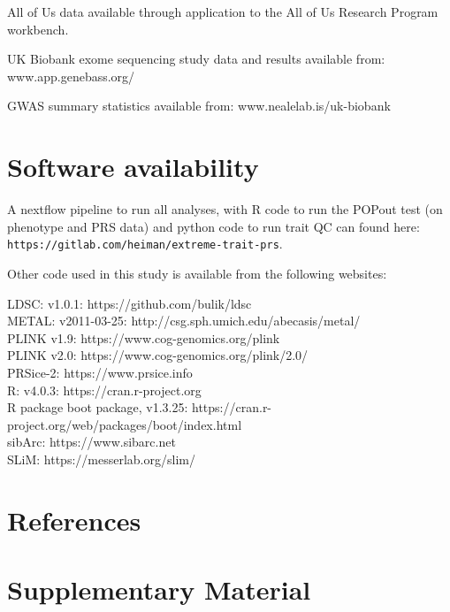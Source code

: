 \documentclass[12pt]{zHenriquesLab-StyleBioRxiv}
\begin{document}
{{{All of Us data available through application to the All of Us Research Program workbench.

UK Biobank exome sequencing study data and results available from: www.app.genebass.org/

GWAS summary statistics available from: www.nealelab.is/uk-biobank


   }

\section*{Software availability}
A nextflow pipeline to run all analyses, with R code to run the POPout test (on phenotype and PRS data) and
python code to run trait QC can found here: {\tt https://gitlab.com/heiman/extreme-trait-prs}.
  
Other code used in this study is available from the following websites:
 
     LDSC: v1.0.1: {https://github.com/bulik/ldsc} \\
    METAL: v2011-03-25: {http://csg.sph.umich.edu/abecasis/metal/} \\
    PLINK v1.9: {https://www.cog-genomics.org/plink}\\
    PLINK v2.0: {https://www.cog-genomics.org/plink/2.0/}     \\
    PRSice-2: {https://www.prsice.info} \\
     R:  v4.0.3: {https://cran.r-project.org}\\
     R package boot package, v1.3.25: {https://cran.r-project.org/web/packages/boot/index.html}\\
     sibArc: {https://www.sibarc.net}\\
     SLiM: {https://messerlab.org/slim/}\\

\section*{References} \label{sec:references} 

\clearpage \newpage


\section*{Supplementary Material} \label{sec:supplement}


\renewcommand{\figurename}{Supplementary Figure}
\setcounter{figure}{0}   






}}
\end{document}
